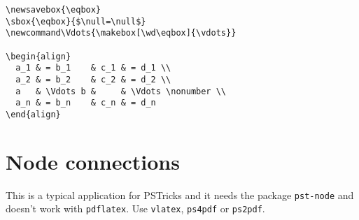 \begin{table}[htb]
\begin{lstlisting}
\newsavebox{\eqbox}
\sbox{\eqbox}{$\null=\null$}
\newcommand\Vdots{\makebox[\wd\eqbox]{\vdots}}

\begin{align}
  a_1 & = b_1    & c_1 & = d_1 \\
  a_2 & = b_2    & c_2 & = d_2 \\
  a   & \Vdots b &     & \Vdots \nonumber \\
  a_n & = b_n    & c_n & = d_n 
\end{align}
\end{lstlisting}


\section{Node connections}
This is a typical application for PSTricks and it needs the package \verb+pst-node+
and doesn't work with \verb+pdflatex+. Use \verb+vlatex+, \verb+ps4pdf+ or \verb+ps2pdf+.

\medskip
\noindent{}

\iffalse
\noindent\fbox{\parbox{\linewidth-2\fboxsep-2\fboxrule}{%
\psset{nodesep=3pt}
\definecolor{lila}{rgb}{0.6,0.2,0.5}
\definecolor{darkyellow}{rgb}{1,0.9,0}
Die Bindungsenergie im Tr\"opfchenmodell setzt sich aus
folgenden Teilen zusammen:
\begin{itemize}
\item dem \rnode{b}{Oberfl\"achenanteil}
\item dem \rnode{a}{Volumenanteil},\\[0.75cm]
\def\xstrut{\vphantom{\frac{(A)^1}{(B)^1}}}
\begin{equation}
E =
\rnode[t]{ae}{\psframebox*[fillcolor=darkyellow,
  linestyle=none]{\xstrut a_vA}} +
\rnode[t]{be}{\psframebox*[fillcolor=lightgray,
  linestyle=none]{\xstrut -a_fA^{2/3}}} +
\rnode[t]{ce}{\psframebox*[fillcolor=green,
  linestyle=none]{\xstrut -a_c\dfrac{Z(Z-1)}{A^{1/3}}}} +
\rnode[t]{de}{\psframebox*[fillcolor=cyan,
  linestyle=none]{\xstrut -a_s\frac{(A-2Z)^2}{A}}} +
\rnode[t]{ee}{\psframebox*[fillcolor=yellow,
  linestyle=none]{\xstrut E_p}}
\end{equation}\\
\item dem \rnode{c}{Coulomb-Anteil}
\item der \rnode{d}{Symmetrieenergie}
\item sowie einem \rnode{e}{Paarbildungsbeitrag}.
\end{itemize}
\nccurve[angleA=-90,angleB=90]{->}{a}{ae}
\nccurve[angleB=45]{->}{b}{be}
\nccurve[angleB=-90]{->}{c}{ce}
\nccurve[angleB=-90]{->}{d}{de}
\nccurve[angleB=-90]{->}{e}{ee}
}}
\fi


\end{table}
